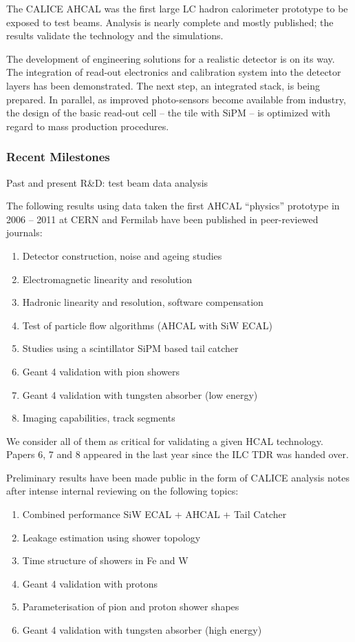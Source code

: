 The CALICE AHCAL was the first large LC hadron calorimeter prototype to be exposed to test beams. Analysis is nearly complete and mostly published; the results validate the technology and the simulations. 

The development of engineering solutions for a realistic detector is on its way. The integration of read-out electronics and calibration system into the detector layers has been demonstrated. The next step, an integrated stack, is being prepared. In parallel, as improved photo-sensors become available from industry, the design of the basic read-out cell -- the tile with SiPM -- is optimized with regard to mass production procedures. 

\subsubsection{Recent Milestones}
Past and present R\&D: test beam data analysis

The following results using data taken the first AHCAL ``physics'' prototype in 2006 -- 2011 at CERN and Fermilab have been published in peer-reviewed journals:
\begin{enumerate}
\item Detector construction, noise and ageing studies  
\item Electromagnetic linearity and resolution  
\item Hadronic linearity and resolution, software compensation   
\item Test of particle flow algorithms (AHCAL with SiW ECAL)  
\item Studies using a scintillator SiPM based tail catcher  
\item Geant 4 validation with pion showers  
\item Geant 4 validation with tungsten absorber (low energy)  
\item Imaging capabilities, track segments  
\end{enumerate}

We consider all of them as critical for validating a given HCAL technology. Papers 6, 7 and 8 appeared in the last year since the ILC TDR was handed over. 

Preliminary results have been made public in the form of CALICE analysis notes after intense internal reviewing on the following topics:
\begin{enumerate}
\item Combined performance SiW ECAL + AHCAL + Tail Catcher   
\item Leakage estimation using shower topology  
\item Time structure of showers in Fe and W  
\item Geant 4 validation with protons   
\item Parameterisation of pion and proton shower shapes 
\item Geant 4 validation with tungsten absorber (high energy)
\end{enumerate}

